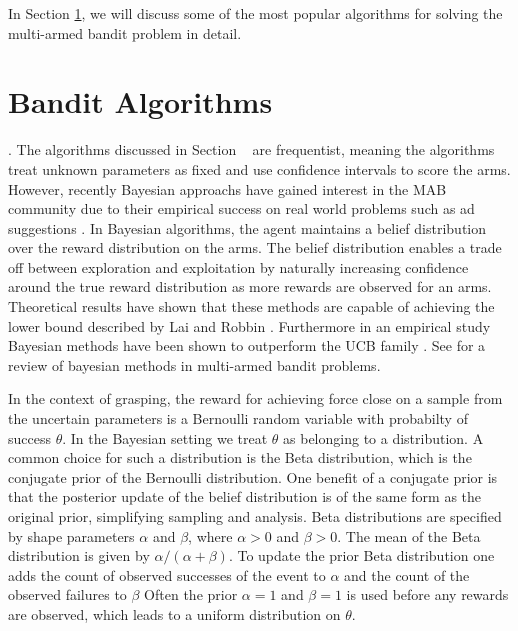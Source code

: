 \documentclass[journal,transmag]{IEEEtran}%
\begin{document}
In Section \ref{sec:bandit_algorithm}, we will discuss some of the most popular algorithms for solving the multi-armed bandit problem in detail. 

\section{Bandit Algorithms}\label{sec:bandit_algorithm}

.
The algorithms discussed in Section ~\secref{} are frequentist, meaning the algorithms treat unknown parameters as fixed and use confidence intervals to score the arms. 
However, recently Bayesian approachs have gained interest in the MAB community due to their empirical success on real world problems such as ad suggestions \cite{kaufmann2012bayesian} \cite{agrawal2011analysis}.
In Bayesian algorithms, the agent maintains a belief distribution over the reward distribution on the arms.
The belief distribution enables a trade off between exploration and exploitation by naturally increasing confidence around the true reward distribution as more rewards are observed for an arms.
Theoretical results have shown that these methods are capable of achieving the lower bound described by Lai and Robbin \cite{agrawal2011analysis} \cite{kaufmann2012bayesian}.
Furthermore in an empirical study Bayesian methods have been shown to outperform the UCB family \cite{chapelle2011empirical}. 
See \cite{} for a review of bayesian methods in multi-armed bandit problems. 

In the context of grasping, the reward for achieving force close on a sample from the uncertain parameters is a Bernoulli random variable with probabilty of success $\theta$.
In the Bayesian setting we treat $\theta$ as belonging to a distribution.
A common choice for such a distribution is the Beta distribution, which is the conjugate prior of the Bernoulli distribution.
One benefit of a conjugate prior is that the posterior update of the belief distribution is of the same form as the original prior, simplifying sampling and analysis.
Beta distributions are specified by shape parameters $\alpha$ and $\beta$, where $\alpha >0$ and $\beta >0$.
The mean of the Beta distribution is given by $\alpha/(\alpha+\beta)$.
To update the prior Beta distribution one adds the count of observed successes of the event to $\alpha$ and the count of the observed failures to $\beta$
Often the prior $\alpha =1 $ and $\beta =1$ is used before any rewards are observed, which leads to a uniform distribution on $\theta$. 
\end{document}

